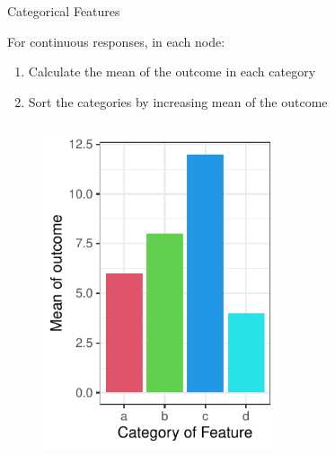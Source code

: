 \documentclass[11pt,compress,t,notes=noshow, xcolor=table]{beamer}
\begin{document}
\begin{vbframe}{Categorical Features}

For continuous responses, in each node:
  \begin{enumerate}
  \item Calculate the mean of the outcome in each category
  \item Sort the categories by increasing mean of the outcome
  \end{enumerate}

  \begin{columns}
  \begin{column}{0.33\textwidth}
  \begin{figure}
  \includegraphics[width=0.8\textwidth]{figure/categoryplot-cont1.pdf} 
  \end{figure}
  \end{column}
  \begin{column}{0.33\textwidth}
  \begin{figure}

\end{figure}
\end{column}
\end{columns}
\end{vbframe}
\end{document}
